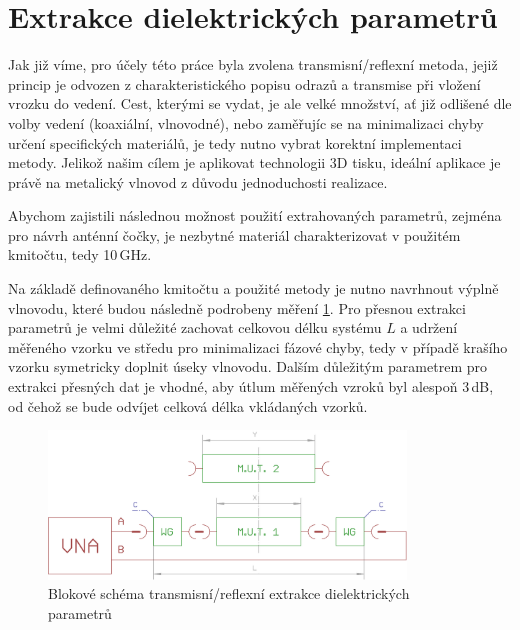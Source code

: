\section{Extrakce dielektrických parametrů}
Jak již víme, pro účely této práce byla zvolena transmisní/reflexní metoda, jejiž princip je odvozen z charakteristického popisu odrazů a transmise při vložení vrozku do vedení. Cest, kterými se vydat, je ale velké množství, ať již odlišené dle volby vedení (koaxiální, vlnovodné), nebo zaměřujíc se na minimalizaci chyby určení specifických materiálů, je tedy nutno vybrat korektní implementaci metody. Jelikož našim cílem je aplikovat technologii 3D tisku, ideální aplikace je právě na metalický vlnovod z důvodu jednoduchosti realizace.

Abychom zajistili následnou možnost použití extrahovaných parametrů, zejména pro návrh anténní čočky, je nezbytné materiál charakterizovat v použitém kmitočtu, tedy 10\,GHz.

Na základě definovaného kmitočtu a použité metody je nutno navrhnout výplně vlnovodu, které budou následně podrobeny měření \ref{fig:ExtractBlock}. Pro přesnou extrakci parametrů je velmi důležité zachovat celkovou délku systému $L$ a udržení měřeného vzorku ve středu pro minimalizaci fázové chyby, tedy v případě krašího vzorku symetricky doplnit úseky vlnovodu. Dalším důležitým parametrem pro extrakci přesných dat je vhodné, aby útlum měřených vzroků byl alespoň 3\,dB, od čehož se bude odvíjet celková délka vkládaných vzorků.

\begin{figure}[h]
\begin{center}
\includegraphics[width=9.5cm]{pics/ExtractBlock}
\caption{Blokové schéma transmisní/reflexní extrakce dielektrických parametrů}
\label{fig:ExtractBlock}
\end{center}
\end{figure} 




